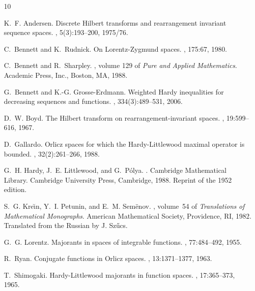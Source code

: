 \documentclass[nointlimits]{amsart}
\numberwithin{equation}{section}
\theoremstyle{plain}
\theoremstyle{definition}
\begin{document}
\begin{thebibliography}{10}

K.~F. Andersen.
\newblock Discrete {H}ilbert transforms and rearrangement invariant sequence
  spaces.
, 5(3):193--200, 1975/76.

C.~Bennett and K.~Rudnick.
\newblock On {L}orentz-{Z}ygmund spaces.
, 175:67, 1980.

C.~Bennett and R.~Sharpley.
, volume 129 of {\em Pure and
  Applied Mathematics}.
\newblock Academic Press, Inc., Boston, MA, 1988.

G.~Bennett and K.-G. Grosse-Erdmann.
\newblock Weighted {H}ardy inequalities for decreasing sequences and functions.
, 334(3):489--531, 2006.

D.~W. Boyd.
\newblock The {H}ilbert transform on rearrangement-invariant spaces.
, 19:599--616, 1967.

D.~Gallardo.
\newblock Orlicz spaces for which the {H}ardy-{L}ittlewood maximal operator is
  bounded.
, 32(2):261--266, 1988.

G.~H. Hardy, J.~E. Littlewood, and G.~P\'olya.
.
\newblock Cambridge Mathematical Library. Cambridge University Press,
  Cambridge, 1988.
\newblock Reprint of the 1952 edition.

S.~G. Kre{\u{\i}}n, Y.~I. Petunin, and E.~M. Sem{\"e}nov.
, volume~54 of {\em
  Translations of Mathematical Monographs}.
\newblock American Mathematical Society, Providence, RI, 1982.
\newblock Translated from the Russian by J. Sz\H ucs.

G.~G. Lorentz.
\newblock Majorants in spaces of integrable functions.
, 77:484--492, 1955.

R.~Ryan.
\newblock Conjugate functions in {O}rlicz spaces.
, 13:1371--1377, 1963.

T.~Shimogaki.
\newblock Hardy-{L}ittlewood majorants in function spaces.
, 17:365--373, 1965.

\end{thebibliography}
\end{document}
